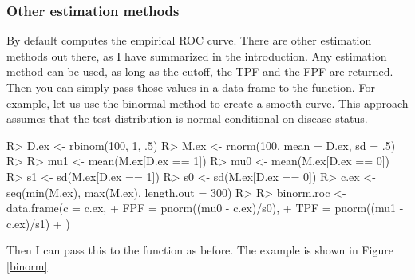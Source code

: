 \documentclass[codesnippet]{jss}
\begin{document}
\subsubsection{Other estimation methods}\label{other-estimation-methods}

By default  computes the empirical ROC curve. There
are other estimation methods out there, as I have summarized in the
introduction. Any estimation method can be used, as long as the cutoff,
the TPF and the FPF are returned. Then you can simply pass those values
in a data frame to the  function. For example, let us use
the binormal method to create a smooth curve. This approach assumes that
the test distribution is normal conditional on disease status.

\begin{Schunk}
\begin{Sinput}
R> D.ex <- rbinom(100, 1, .5)
R> M.ex <- rnorm(100, mean = D.ex, sd = .5)
R> 
R> mu1 <- mean(M.ex[D.ex == 1])
R> mu0 <- mean(M.ex[D.ex == 0])
R> s1 <- sd(M.ex[D.ex == 1])
R> s0 <- sd(M.ex[D.ex == 0])
R> c.ex <- seq(min(M.ex), max(M.ex), length.out = 300)
R> 
R> binorm.roc <- data.frame(c = c.ex, 
+                              FPF = pnorm((mu0 - c.ex)/s0), 
+                              TPF = pnorm((mu1 - c.ex)/s1)
+                              )
\end{Sinput}
\end{Schunk}

Then I can pass this  to the  function as
before. The example is shown in Figure \ref{binorm}.
\end{document}
